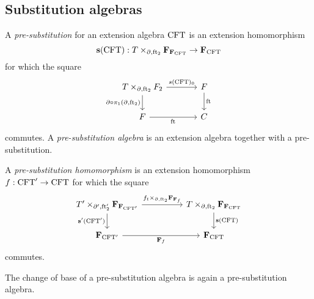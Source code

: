 \subsection{Substitution algebras}

\begin{defn}
A \emph{pre-substitution} for an extension algebra $\mathrm{CFT}$ is an
extension homomorphism
\begin{equation*}
\mathbf{s}(\stesys):\cobesys{\stesyst}{\famesys{\famesys{\stesys}}}{\ebd}{\eft[2]}\to \famesys{\stesys}
\end{equation*}
for which the square
\begin{equation*}
\begin{tikzcd}[column sep=large]
\pullback{\stesyst}{\stesysf_2}{\ebd}{\eft[2]}
  \ar{r}{s(\stesys)_0}
  \ar{d}[swap]{\ebd\circ\pullbackpr{1}{\ebd}{\eft[2]}}
  &
\stesysf 
  \ar{d}{\eft}
  \\
\stesysf 
  \ar{r}[swap]{\eft}
  &
\stesysc
\end{tikzcd}
\end{equation*}
commutes. A \emph{pre-substitution algebra} is an extension algebra
together with a pre-substitution.
\end{defn}

\begin{defn}
A \emph{pre-substitution homomorphism} is an extension homomorphism $f:\mathrm{CFT}'\to \mathrm{CFT}$
for which the square
\begin{equation*}
\begin{tikzcd}[column sep=huge]
\cobesys{\stesyst'}{\famesys{\famesys{\stesys'}}}{\ebd'}{\eft[2]'}
  \ar{r}{\pullback{f_t}{\famehom{\famehom{f}}}{\ebd}{\eft[2]}}
  \ar{d}[swap]{\mathbf{s}'(\stesys')}
  &
\cobesys{\stesyst}{\famesys{\famesys{\stesys}}}{\ebd}{\eft[2]}
  \ar{d}{\mathbf{s}(\stesys)}
  \\
\famesys{\stesys'}
  \ar{r}[swap]{\famehom{f}}
  &
\famesys{\stesys}
\end{tikzcd}
\end{equation*}
commutes.
\end{defn}

\begin{lem}
The change of base of a pre-substitution algebra is again a pre-substitution algebra.
\end{lem}

